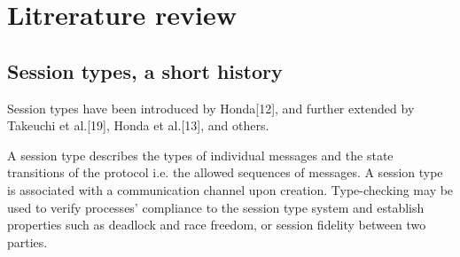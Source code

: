 \section{Litrerature review}
%
%
%
%


\subsection{Session types, a short history}
\label{sub: st}


Session types have been introduced by Honda[12], and further extended by Takeuchi et al.[19], Honda et al.[13], and others.



 A session type describes the types of individual messages and the state transitions of the protocol i.e. the allowed sequences of messages. A session type is associated with a communication channel upon creation. Type-checking may be used to verify processes’ compliance to the session type system and establish properties such as deadlock and race freedom, or session fidelity between two parties.


